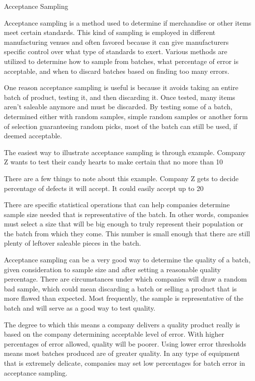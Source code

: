 
Acceptance Sampling

Acceptance sampling is a method used to determine if merchandise or other items meet certain standards. This kind of sampling is employed in different manufacturing venues and often favored because it can give manufacturers specific control over what type of standards to exert. Various methods are utilized to determine how to sample from batches, what percentage of error is acceptable, and when to discard batches based on finding too many errors.


One reason acceptance sampling is useful is because it avoids taking an entire batch of product, testing it, and then discarding it. Once tested, many items aren’t saleable anymore and must be discarded. By testing some of a batch, determined either with random samples, simple random samples or another form of selection guaranteeing random picks, most of the batch can still be used, if deemed acceptable.


The easiest way to illustrate acceptance sampling is through example. Company Z wants to test their candy hearts to make certain that no more than 10%


There are a few things to note about this example. Company Z gets to decide percentage of defects it will accept. It could easily accept up to 20%


There are specific statistical operations that can help companies determine sample size needed that is representative of the batch. In other words, companies must select a size that will be big enough to truly represent their population or the batch from which they come. This number is small enough that there are still plenty of leftover saleable pieces in the batch.


Acceptance sampling can be a very good way to determine the quality of a batch, given consideration to sample size and after setting a reasonable quality percentage. There are circumstances under which companies will draw a random bad sample, which could mean discarding a batch or selling a product that is more flawed than expected. Most frequently, the sample is representative of the batch and will serve as a good way to test quality.


The degree to which this means a company delivers a quality product really is based on the company determining acceptable level of error. With higher percentages of error allowed, quality will be poorer. Using lower error thresholds means most batches produced are of greater quality. In any type of equipment that is extremely delicate, companies may set low percentages for batch error in acceptance sampling.
